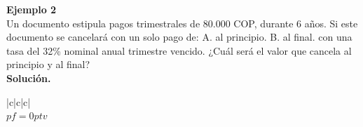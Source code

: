 \textbf{Ejemplo 2}\\

Un documento estipula pagos trimestrales de 80.000 COP, durante 6 años. Si este documento se
cancelará con un solo pago de: A. al principio. B. al final. con una tasa del 32\% nominal
anual trimestre vencido. ¿Cuál será el valor que cancela al principio y al final?
\\

\textbf{Solución.}\\
\begin{center}
	\renewcommand{\arraystretch}{1.5}%
\begin{longtable}[H]{|c|c|c|}
\hline
   \\ \hline
{} {$pf = 0 ptv$} \\ \hline
  
    \\ \hline


\end{longtable}
\end{center}
